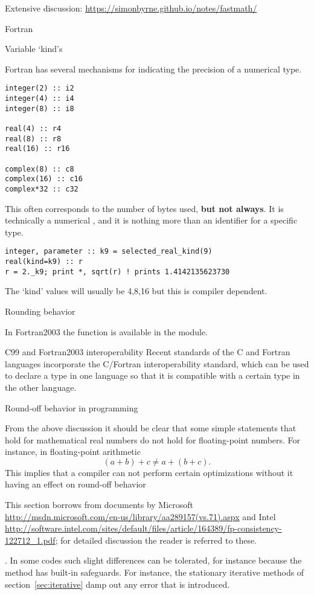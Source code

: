 Extensive discussion: \url{https://simonbyrne.github.io/notes/fastmath/}

 {Fortran}

 {Variable `kind's}
\label{sec:fprecision}

Fortran has several mechanisms for indicating the precision of a numerical type.
%
\begin{lstlisting}
integer(2) :: i2
integer(4) :: i4
integer(8) :: i8

real(4) :: r4
real(8) :: r8
real(16) :: r16

complex(8) :: c8
complex(16) :: c16
complex*32 :: c32
\end{lstlisting}

This often corresponds to the number of bytes used, \textbf{but not always}.
It is technically a numerical ,
and it is nothing more than an identifier for a specific type.

\begin{lstlisting}
integer, parameter :: k9 = selected_real_kind(9)
real(kind=k9) :: r
r = 2._k9; print *, sqrt(r) ! prints 1.4142135623730
\end{lstlisting}
The `kind' values will usually be 4,8,16 but this is compiler
dependent.

 {Rounding behavior}

In Fortran2003 the function 
is available in the  module.

 {C99 and Fortran2003 interoperability}
%
Recent standards of the C and Fortran
languages incorporate the C/Fortran interoperability standard, which
can be used to declare a type in one language so that it is compatible
with a certain type in the other language.

 {Round-off behavior in programming}
\label{sec:round-compile}

From the above discussion it should be clear that some simple statements
that hold for mathematical real numbers do not hold for floating-point numbers.
For instance, in floating-point arithmetic 
\begin{equation}
  (a+b)+c\not=a+(b+c).
\end{equation}
This implies that a compiler can not perform certain optimizations
without it having an effect on round-off behavior
\begin{footnoteenv}
  {This
section borrows from documents by
Microsoft \url{http://msdn.microsoft.com/en-us/library/aa289157(vs.71).aspx}
and
Intel \url{http://software.intel.com/sites/default/files/article/164389/fp-consistency-122712_1.pdf};
for detailed discussion the reader is referred to these.}
\end{footnoteenv}
.  In some
codes such slight differences can be tolerated, for instance because
the method has built-in safeguards. For instance, the stationary
iterative methods of section~\ref{sec:iterative} damp out any error
that is introduced. 

